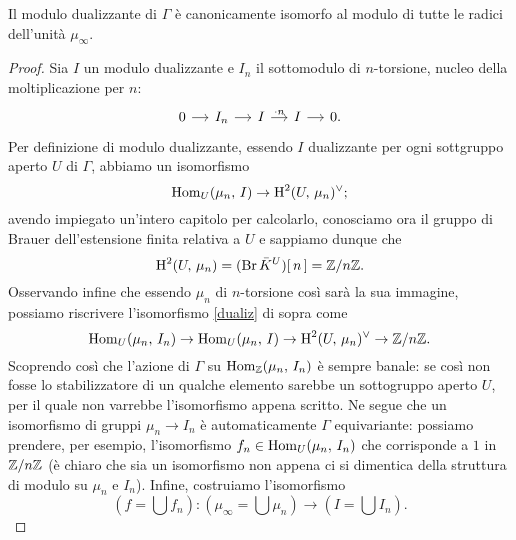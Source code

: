
\begin{proposition}
	Il modulo dualizzante di $ \Gamma $ è canonicamente isomorfo al modulo di tutte le radici dell'unità $ \mu_\infty $.
\end{proposition}
\begin{proof}
	Sia $ I $ un modulo dualizzante e $ I_n $ il sottomodulo di $ n $-torsione, nucleo della moltiplicazione per $ n $:
	\[ \begin{tikzcd}[column sep = small]
	0 \rar & I_n \rar & I \rar["\cdot n"] & I \rar & 0.
	\end{tikzcd} \]
	Per definizione di modulo dualizzante, essendo $ I $ dualizzante per ogni sottgruppo aperto $ U $ di $ \Gamma $, abbiamo un isomorfismo
	\begin{equation}\label{dualiz}
		 \operatorname{Hom}_U(\mu_n, \, I) \to \operatorname{H}^2(U, \, \mu_n)^\vee;
	\end{equation}
	avendo impiegato un'intero capitolo per calcolarlo, conosciamo ora il gruppo di Brauer dell'estensione finita relativa a $ U $ e sappiamo dunque che $$  \operatorname{H}^2(U, \, \mu_n) = (\operatorname{Br} \bar{K}^U)[\, n\, ] = \mathbb{Z}/n\mathbb{Z}.  $$
	Osservando infine che essendo $ \mu_n $ di $ n $-torsione così sarà la sua immagine, possiamo riscrivere l'isomorfismo \eqref{dualiz} di sopra come
	\[ \operatorname{Hom}_U(\mu_n, \, I_n) \to \operatorname{Hom}_U(\mu_n, \, I) \to \operatorname{H}^2(U, \, \mu_n)^\vee \to \mathbb{Z}/n\mathbb{Z}. \]
	Scoprendo così che l'azione di $ \Gamma $ su $ \operatorname{Hom}_{\mathbb{Z}}(\mu_n, \, I_n) $ è sempre banale: se così non fosse lo stabilizzatore di un qualche elemento sarebbe un sottogruppo aperto $ U $, per il quale non varrebbe l'isomorfismo appena scritto. Ne segue che un isomorfismo di gruppi $ \mu_n \to I_n $ è automaticamente $ \Gamma $ equivariante: possiamo prendere, per esempio, l'isomorfismo $ f_n \in \operatorname{Hom}_U(\mu_n, \, I_n) $ che corrisponde a $ 1 $ in $ \mathbb{Z}/n\mathbb{Z} $ (è chiaro che sia un isomorfismo non appena ci si dimentica della struttura di modulo su $ \mu_n $ e $ I_n $). Infine, costruiamo l'isomorfismo
	\[ \left(f = \bigcup f_n\right) \colon \left(\mu_\infty = \bigcup \mu_n\right) \to \left(I = \bigcup I_n\right).  \]
	 
\end{proof}

